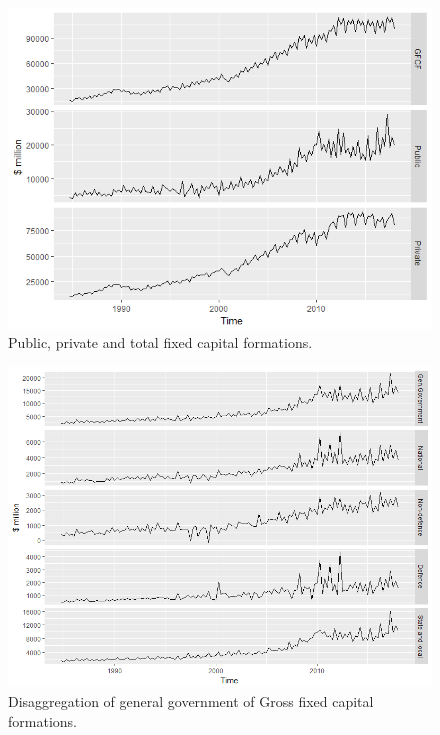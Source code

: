 \documentclass[graybox]{svmult}
\begin{document}
\begin{figure}[H]
	\centering
	\small
	\includegraphics[scale=0.65]{Figs/TS-plots/EXP-hierarchy/set-6.png}
	\caption{Public, private and total fixed capital formations.}\label{EXP-set-6}
\end{figure}

\begin{figure}[H]
	\centering
	\small
	\includegraphics[scale=0.5]{Figs/TS-plots/EXP-hierarchy/set-7.png}
	\caption{Disaggregation of general government of Gross fixed capital formations.}\label{EXP-set-7}
\end{figure}
\end{document}
